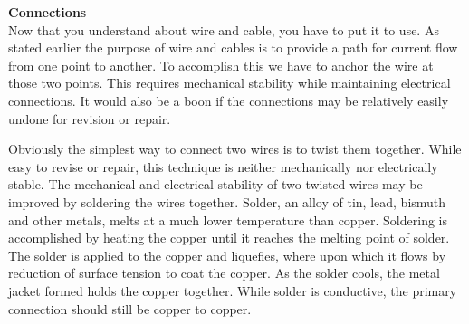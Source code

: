 \documentclass[12pt]{article}
\begin{document}
\begin{enumerate}[1.]
{\bf Connections}\\
Now that you understand about wire and cable, you have to put it to use. 
As stated earlier the purpose of wire and cables
is to provide a path for current flow from one point to another. 
To accomplish this we have to anchor the wire at those two points. 
This requires mechanical stability while maintaining electrical connections. 
It would also be a boon if the connections may be relatively easily undone for revision or repair.

\par Obviously the simplest way to connect two wires is to twist them together. 
While easy to revise or repair, this technique is neither mechanically nor electrically stable. 
The mechanical and electrical stability of two twisted wires may be improved by soldering the wires together. 
Solder, an alloy of tin, lead, bismuth and other metals, melts at a much lower temperature than copper. 
Soldering is accomplished by heating the copper until it reaches the melting point of solder. 
The solder is applied to the copper and liquefies, where upon which it flows by reduction of surface tension to coat the copper. 
As the solder cools, the metal jacket formed holds the copper together. 
While solder is conductive, the primary connection should still be copper to copper.

%


\end{enumerate}
\end{document}
